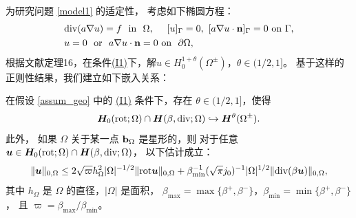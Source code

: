 为研究问题 \eqref{model1} 的适定性，
考虑如下椭圆方程：
\begin{equation}
\begin{split}
\label{H1eqn}
& \mathrm{div}(a\nabla u) = f ~~ \text{in} ~~ \Omega, ~~~~ [u]_{\Gamma} =0, ~ [a\nabla
u\cdot\mathbf{n}]_{\Gamma}=0 ~ \text{on} ~ \Gamma,\\
& u=0 ~~ \text{or} ~~ a\nabla u \cdot \mathbf{n} =0 ~ \text{on} ~~ \partial\Omega,
\end{split}
\end{equation}
根据文献\cite{2016Ciarlet}定理16，在条件\hyperref[asp:I1]{(I1)}下，解$u\in H^{1+\theta}_0(\Omega^{\pm})$，$\theta\in(1/2,1]$。
基于这样的正则性结果，我们建立如下嵌入关系：
\begin{lemma}
\label{lem_embd_1}
在假设 \ref{assum_geo} 中的 \hyperref[asp:I1]{(I1)} 条件下，存在 $\theta\in(1/2,1]$，使得
\begin{equation}
\label{lem_embd_1_eq0}
\boldsymbol{H}_0(\mathrm{rot};\Omega)\cap \boldsymbol{H}(\beta, \mathrm{div};\Omega) \hookrightarrow \boldsymbol{H}^{\theta}(\Omega^{\pm}).
\end{equation}
此外，
如果 $\Omega$ 关于某一点 $\mathbf{b}_{\Omega}$ 是星形的，则
对于任意 $\boldsymbol{u}\in \boldsymbol{H}_0(\mathrm{rot};\Omega)\cap \boldsymbol{H}(\beta, \mathrm{div};\Omega)$，
以下估计成立：
\begin{equation}
  \label{lem_embd_1_eq01}
  \| \boldsymbol{u} \|_{0,\Omega} 
  \le 2 \sqrt{\varpi}  h^2_{\Omega}|\Omega|^{-1/2} \|\mathrm{rot} \boldsymbol{u} \|_{0,\Omega} 
  + \beta_{\min}^{-1} ( \sqrt{\pi} j_0)^{-1} |\Omega|^{1/2} \|\mathrm{div}(\beta \boldsymbol{u}) \|_{0,\Omega},
  \end{equation}
其中 $h_{\Omega}$ 是 $\Omega$ 的直径，$|\Omega|$ 是面积，
$\beta_{\max}=\max\{\beta^+,\beta^-\}$，$\beta_{\min}=\min\{\beta^+,\beta^-\}$，
且 $\varpi = \beta_{\max}/\beta_{\min}$。
\end{lemma}
